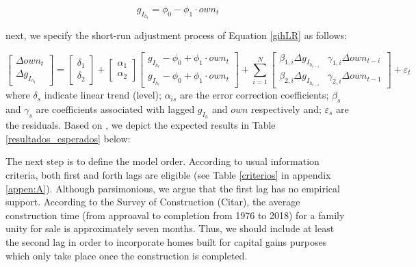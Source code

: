 \documentclass[12pt, a4paper]{article}
\begin{document}
\begin{latex}
\begin{equation}
\label{gihLR}
g_{I_{h_{t}}} = \phi_{0} - \phi_{1}\cdot own_{t}
\end{equation}
\end{latex}
next, we specify the short-run adjustment process of Equation \ref{gihLR} as follows:

\begin{equation}
\begin{bmatrix}
\Delta own_{t}\\
\Delta g_{I_{h_{t}}}
\end{bmatrix} = \begin{bmatrix}\delta_{1}\\\delta_{2}\end{bmatrix} + \begin{bmatrix}\alpha_{1}\\ \alpha_{2}\end{bmatrix} \begin{bmatrix}g_{I_{h_{t}}} - \phi_{0} + \phi_{1}\cdot own_{t}\\g_{I_{h_{t}}} - \phi_{0} + \phi_{1}\cdot own_{t}\end{bmatrix} + \sum^N_{i=1} \begin{bmatrix}\beta_{1,i} \Delta g_{I_{h_{t-i}}} & \gamma_{1,i} \Delta own_{t-i}\\\beta_{2,i} \Delta g_{I_{h_{t-i}}} & \gamma_{2,i} \Delta own_{t-1} \end{bmatrix} + \varepsilon_{t}
\end{equation}
where \(\delta_s\) indicate linear trend (level);
\(\alpha_{is}\) are the error correction coefficients;
\(\beta_s\) and \(\gamma_s\) are coefficients associated with lagged \(g_{I_h}\) and \(own\) respectively and; \(\varepsilon_s\) are the residuals.
Based on \textcite{teixeira_crescimento_2015}, we depict the expected results in Table \ref{resultados_esperados} below:





The next step is to define the model order. According to usual information criteria, both first and forth lags are eligible (see Table \ref{criterios} in appendix \ref{appen:A}).
Although parsimonious, we argue that the first lag has no empirical support.
According to the Survey of Construction (Citar), the average construction time (from approaval to completion from 1976 to 2018) for a family unity for sale is approximately seven months.
Thus, we should include at least the second lag in order to incorporate homes built for capital gains purposes which only take place once the construction is completed.
\end{document}
